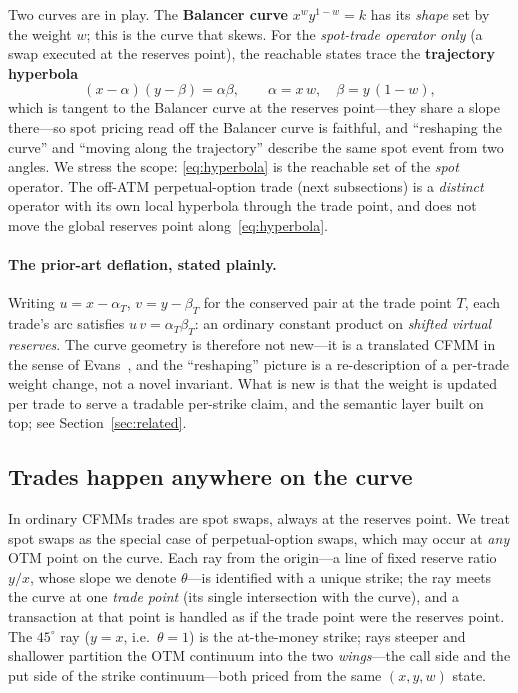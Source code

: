 \documentclass[runningheads]{llncs}
\begin{document}
Two curves are in play. The \textbf{Balancer curve} $x^{w}y^{1-w}=k$ has its
\emph{shape} set by the weight $w$; this is the curve that skews. For the
\emph{spot-trade operator only} (a swap executed at the reserves point), the
reachable states trace the \textbf{trajectory hyperbola}
\begin{equation}
  (x-\alpha)(y-\beta)=\alpha\beta,\qquad \alpha=x\,w,\quad \beta=y\,(1-w),
  \label{eq:hyperbola}
\end{equation}
which is tangent to the Balancer curve at the reserves point---they share a slope
there---so spot pricing read off the Balancer curve is faithful, and ``reshaping
the curve'' and ``moving along the trajectory'' describe the same spot event from
two angles. We stress the scope: \eqref{eq:hyperbola} is the reachable set of the
\emph{spot} operator. The off-ATM perpetual-option trade (next subsections) is a
\emph{distinct} operator with its own local hyperbola through the trade point, and
does not move the global reserves point along~\eqref{eq:hyperbola}.

\paragraph{The prior-art deflation, stated plainly.}
Writing $u=x-\alpha_T$, $v=y-\beta_T$ for the conserved pair at the trade point
$T$, each trade's arc satisfies $u\,v=\alpha_T\beta_T$: an ordinary constant
product on \emph{shifted virtual reserves}. The curve geometry is therefore not
new---it is a translated CFMM in the sense of Evans~\cite{evans2020}, and the
``reshaping'' picture is a re-description of a per-trade weight change, not a
novel invariant. What is new is that the weight is updated per trade to serve a
tradable per-strike claim, and the semantic layer built on top; see
Section~\ref{sec:related}.

\subsection{Trades happen anywhere on the curve}
In ordinary CFMMs trades are spot swaps, always at the reserves point. We treat
spot swaps as the special case of perpetual-option swaps, which may occur at
\emph{any} OTM point on the curve. Each ray from the origin---a line of fixed
reserve ratio $y/x$, whose slope we denote $\theta$---is identified with a unique
strike; the ray meets the curve at one \emph{trade point} (its single intersection
with the curve), and a transaction at that point is handled as if the trade point
were the reserves point. The $45^{\circ}$ ray ($y=x$, i.e.\ $\theta=1$) is the
at-the-money strike; rays steeper and shallower partition the OTM continuum into
the two \emph{wings}---the call side and the put side of the strike continuum---both
priced from the same $(x,y,w)$ state.
\end{document}
